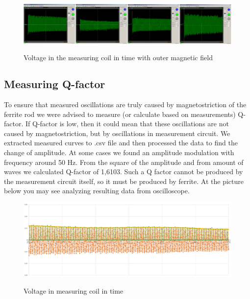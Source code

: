 \documentclass[10pt,a4paper]{article}
\begin{document}
\begin{figure}[H]
\centering
    \includegraphics[width=\textwidth]{sf.png}
    \label{fig:uvod}
    \caption{Voltage in the measuring coil in time with outer magnetic field}
\end{figure}

\subsection{Measuring Q-factor}
To ensure that measured oscillations are truly caused by magnetostriction of the ferrite rod we were advised to measure (or calculate based on measurements) Q-factor. If Q-factor is low, then it could mean that these oscillations are not caused by magnetostriction, but by oscillations in measurement circuit. We extracted measured curves to .csv file and then processed the data to find the change of amplitude. At some cases we found an amplitude modulation with frequency around 50 Hz. From the square of the amplitude and from amount of waves we calculated Q-factor of 1,6103. Such a Q factor cannot be produced by the measurement circuit itself, so it must be produced by ferrite. At the picture below you may see analyzing resulting data from oscilloscope.

\begin{figure}[H]
\centering
    \includegraphics[width=\textwidth]{volt.png}
    \label{fig:uvod}
    \caption{Voltage in measuring coil in time}
\end{figure}
\end{document}
